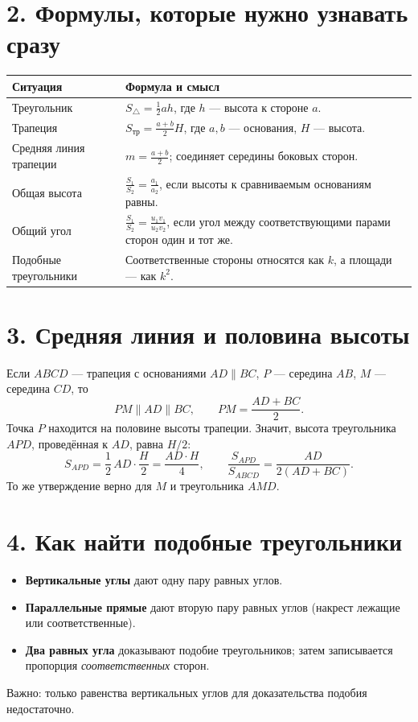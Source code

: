 \documentclass[a4paper,12pt]{article}
\newcommand{\key}[1]{\textcolor{darkaccent}{\textbf{#1}}}
\begin{document}
\section*{2. Формулы, которые нужно узнавать сразу}
\begin{tabularx}{\linewidth}{@{}>{\raggedright\arraybackslash}p{.38\linewidth} X@{}}
\toprule
\textbf{Ситуация} & \textbf{Формула и смысл}\\
\midrule
Треугольник & $\displaystyle S_\triangle=\frac12 ah$, где $h$ --- высота к стороне $a$.\\[1mm]
Трапеция & $\displaystyle S_{\text{тр}}=\frac{a+b}{2}H$, где $a,b$ --- основания, $H$ --- высота.\\[1mm]
Средняя линия трапеции & $\displaystyle m=\frac{a+b}{2}$; соединяет середины боковых сторон.\\[1mm]
Общая высота & $\displaystyle \frac{S_1}{S_2}=\frac{a_1}{a_2}$, если высоты к сравниваемым основаниям равны.\\[1mm]
Общий угол & $\displaystyle \frac{S_1}{S_2}=\frac{u_1v_1}{u_2v_2}$, если угол между соответствующими парами сторон один и тот же.\\[1mm]
Подобные треугольники & Соответственные стороны относятся как $k$, а площади --- как $k^2$.\\
\bottomrule
\end{tabularx}

\section*{3. Средняя линия и половина высоты}
Если $ABCD$ --- трапеция с основаниями $AD\parallel BC$, $P$ --- середина $AB$, $M$ --- середина $CD$, то
\[
PM\parallel AD\parallel BC,\qquad PM=\frac{AD+BC}{2}.
\]
Точка $P$ находится на половине высоты трапеции. Значит, высота треугольника $APD$, проведённая к $AD$, равна $H/2$:
\[
S_{APD}=\frac12\,AD\cdot\frac H2=\frac{AD\cdot H}{4},\qquad
\boxed{\frac{S_{APD}}{S_{ABCD}}=\frac{AD}{2(AD+BC)}}.
\]
То же утверждение верно для $M$ и треугольника $AMD$.

\section*{4. Как найти подобные треугольники}
\begin{itemize}
\item \key{Вертикальные углы} дают одну пару равных углов.
\item \key{Параллельные прямые} дают вторую пару равных углов (накрест лежащие или соответственные).
\item \key{Два равных угла} доказывают подобие треугольников; затем записывается пропорция \emph{соответственных} сторон.
\end{itemize}
\textcolor{muted}{Важно: только равенства вертикальных углов для доказательства подобия недостаточно.}
\end{document}
